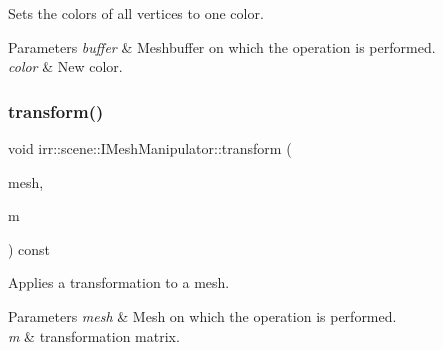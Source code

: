 Sets the colors of all vertices to one color. 


\begin{DoxyParams}{Parameters}
{\em buffer} & Meshbuffer on which the operation is performed. \\
\hline
{\em color} & New color. \\
\hline
\end{DoxyParams}
\mbox{\label{classirr_1_1scene_1_1IMeshManipulator_a9f9962d31cbd4ebeb1be0812765884cf}} 
\subsubsection{\texorpdfstring{transform()}{transform()}\hspace{0.1cm}{\footnotesize\ttfamily [1/4]}}
{\footnotesize\ttfamily void irr\+::scene\+::\+I\+Mesh\+Manipulator\+::transform (\begin{DoxyParamCaption}\item[{\hyperlink{classirr_1_1scene_1_1IMesh}{I\+Mesh} $\ast$}]{mesh,  }\item[{const \hyperlink{namespaceirr_1_1core_a4c9d4e29899535971052810954a14431}{core\+::matrix4} \&}]{m }\end{DoxyParamCaption}) const\hspace{0.3cm}{\ttfamily [inline]}}



Applies a transformation to a mesh. 


\begin{DoxyParams}{Parameters}
{\em mesh} & Mesh on which the operation is performed. \\
\hline
{\em m} & transformation matrix. \\
\hline
\end{DoxyParams}
\mbox{\label{classirr_1_1scene_1_1IMeshManipulator_a9f9962d31cbd4ebeb1be0812765884cf}} 
